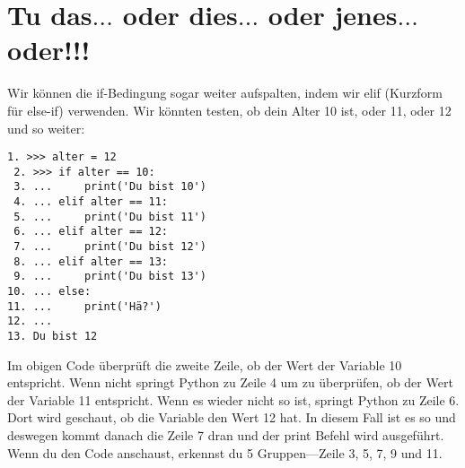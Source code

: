 \section{Tu das$\ldots$ oder dies$\ldots$ oder jenes$\ldots$ oder!!!}

Wir können die if-Bedingung sogar weiter aufspalten, indem wir elif (Kurzform für else-if) verwenden. Wir könnten testen, ob dein Alter 10 ist, oder 11, oder 12 und so weiter:

\begin{Verbatim}[frame=single]
 1. >>> alter = 12
 2. >>> if alter == 10:
 3. ...     print('Du bist 10')
 4. ... elif alter == 11:
 5. ...     print('Du bist 11')
 6. ... elif alter == 12:
 7. ...     print('Du bist 12')
 8. ... elif alter == 13:
 9. ...     print('Du bist 13')
10. ... else:
11. ...     print('Hä?')
12. ...
13. Du bist 12
\end{Verbatim}

Im obigen Code überprüft die zweite Zeile, ob der Wert der Variable 10 entspricht. Wenn nicht springt Python zu Zeile 4 um zu überprüfen, ob der Wert der  Variable 11 entspricht. Wenn es wieder nicht so ist, springt Python zu Zeile 6. Dort wird geschaut, ob die Variable den Wert 12 hat. In diesem Fall ist es so und deswegen kommt danach die Zeile 7 dran und der print Befehl wird ausgeführt. Wenn du den Code anschaust, erkennst du 5 Gruppen---Zeile 3, 5, 7, 9 und 11.

